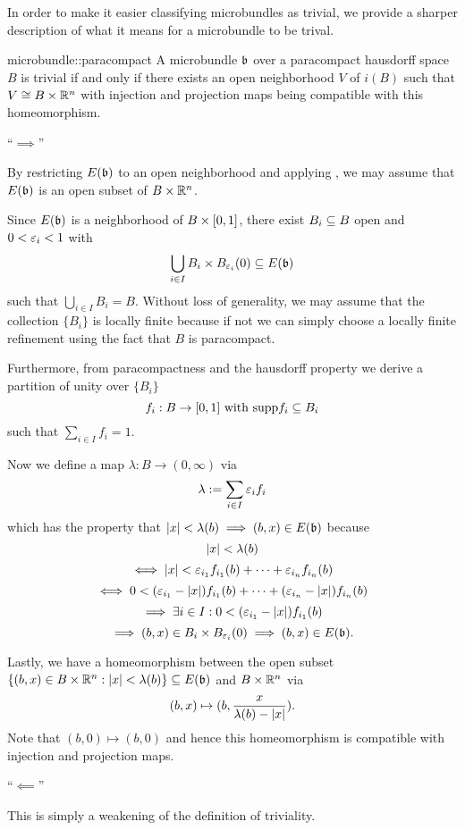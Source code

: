 \begin{myparagraph}
    In order to make it easier classifying microbundles as trivial,
    we provide a sharper description of what it means for a microbundle to be trival. 
\end{myparagraph}

\begin{mylemma}{microbundle::paracompact}
    A microbundle $\mathfrak{b}$ over a paracompact hausdorff space $B$ is trivial
    if and only if there exists an open neighborhood $V$ of $i(B)$ such that $V \cong B \times \mathbb{R}^n$
    with injection and projection maps being compatible with this homeomorphism.
\end{mylemma}

\begin{myproof}
    ``$\implies$''

    By restricting $E(\mathfrak{b})$ to an open neighborhood and applying ,
    we may assume that $E(\mathfrak{b})$ is an open subset of $B \times \mathbb{R}^n$.

    Since $E(\mathfrak{b})$ is a neighborhood of $B \times{} [0, 1]$, there exist $B_i \subseteq{} B$ open and $0 < \varepsilon{}_i < 1$ with
    \[ \bigcup_{i \in I } B_i \times \ball[\eps_i] \sub E(\bb)\]
    such that $\bigcup_{i \in I} B_i = B$.
    Without loss of generality, we may assume that the collection $\{B_i\}$ is locally finite because if not
    we can simply choose a locally finite refinement using the fact that $B$ is paracompact.

    Furthermore, from paracompactness and the hausdorff property we derive a partition of unity over $\{B_i\}$
    \[ f_i: B \to [0, 1] \text{ with } \text{supp}{f_i} \subseteq{} B_i\]
    such that $\sum_{i \in I}f_i = 1$.
    
    Now we define a map $\lambda: B \to (0, \infty)$ via
    \[ \lambda := \sum_{i \in I} \varepsilon{}_i f_i \]
    which has the property that $\vert{} x \vert{} < \lambda(b) \implies (b, x) \in E(\mathfrak{b})$ because
    \[ \vert{} x \vert{} < \lambda(b) \]
    \[ \iff  \vert{} x \vert{} < \varepsilon{}_{i_1} f_{i_1}(b) + \cdots + \varepsilon{}_{i_n} f_{i_n}(b) \]
    \[ \iff 0 < (\varepsilon{}_{i_1} - \vert{} x \vert{}) f_{i_1}(b) + \cdots + (\varepsilon{}_{i_n} - \vert{} x \vert{}) f_{i_n}(b) \]
    \[ \implies \exists i \in I: 0 < (\varepsilon{}_{i_1} - \vert{} x \vert{}) f_{i_1}(b) \]
    \[ \implies (b, x) \in B_i \times \ball[\eps_i]  \implies (b, x) \in E(\bb). \]

    Lastly, we have a homeomorphism between the open subset
    $\{(b, x) \in B \times \mathbb{R}^n:\vert{} x \vert{} < \lambda(b)\} \subseteq{} E(\mathfrak{b})$ and $B \times \mathbb{R}^n$ via
    \[ (b, x) \mapsto (b, \frac{x}{\lambda(b) - \vert{} x \vert{}}). \]
    Note that $(b, 0) \mapsto (b, 0)$ and hence this homeomorphism is compatible with injection and projection maps.

    ``$\impliedby$''

    This is simply a weakening of the definition of triviality. 
\end{myproof}